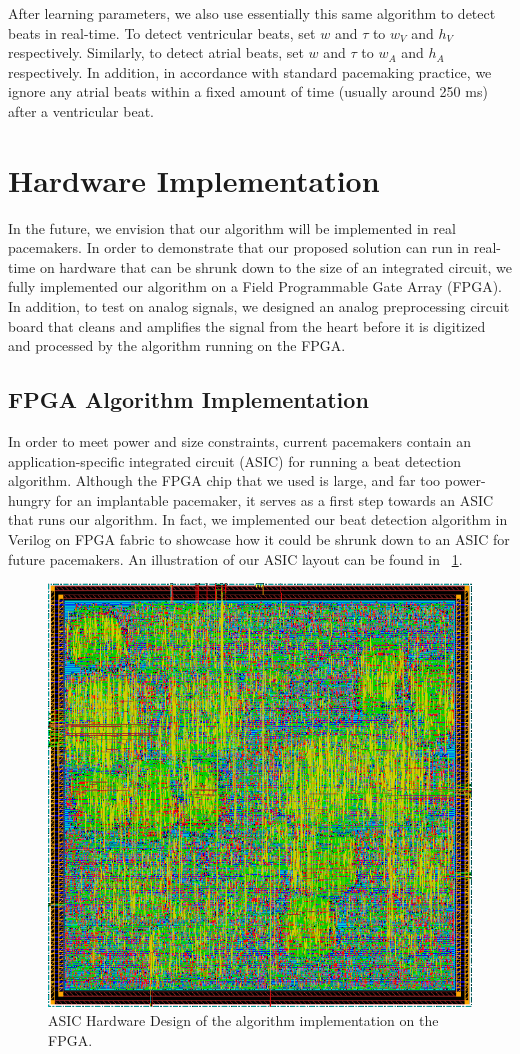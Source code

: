 \documentclass[conference]{IEEEtran}
\newcommand{\APW}{\ensuremath{w_A}}
\newcommand{\VPW}{\ensuremath{w_V}}
\newcommand{\APH}{\ensuremath{h_A}}
\newcommand{\VPH}{\ensuremath{h_V}}
\begin{document}
After learning parameters, we also use essentially this same algorithm to detect beats in real-time.
To detect ventricular beats, set $w$ and $\tau$ to \VPW{} and \VPH{} respectively.
Similarly, to detect atrial beats, set $w$ and $\tau$ to \APW{} and \APH{} respectively.
In addition, in accordance with standard pacemaking practice, we ignore any atrial beats within a fixed amount of time (usually around 250 ms) after
a ventricular beat.

\section{Hardware Implementation}
In the future, we envision that our algorithm will be
implemented in real pacemakers. In order to
demonstrate that our proposed solution can run in
real-time on hardware that can be shrunk down to
the size of an integrated circuit, we fully implemented
our algorithm on a Field Programmable Gate Array
(FPGA).
In addition, to test on analog signals, we
designed an analog preprocessing circuit board that cleans and
amplifies the signal from the heart before it is digitized and processed
by the algorithm running on the FPGA.

\subsection{FPGA Algorithm Implementation}
In order to meet power and size constraints, 
current pacemakers contain an application-specific integrated circuit (ASIC) for running a beat detection algorithm.
Although the FPGA chip that we used is large, and far too power-hungry for an implantable pacemaker,
it serves as a first step towards an ASIC that runs our algorithm.
In fact, we implemented our beat detection algorithm in Verilog on FPGA fabric to
showcase how it could be shrunk down to an ASIC for future pacemakers.
An illustration of our ASIC
layout can be found in \figurename~\ref{fig:fpga}.
\begin{figure}[h]
	\centering
	\includegraphics[width=.7\columnwidth]{fpga.png}
	\caption{ASIC Hardware Design of the algorithm implementation on the FPGA.}
	\label{fig:fpga}
\end{figure}
\end{document}
